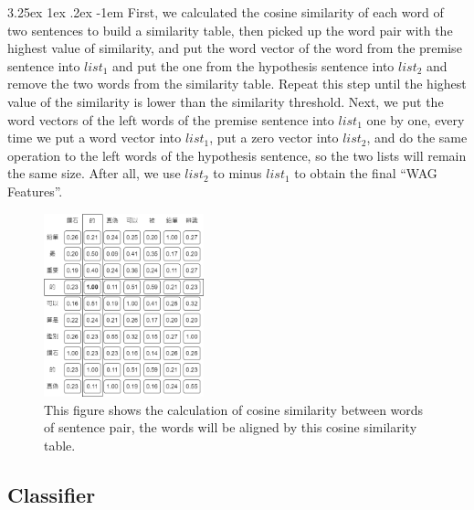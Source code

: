\documentclass[12pt]{article}
\makeatletter
\renewcommand\paragraph{\@startsection{paragraph}{5}{\z@}%
  {3.25ex \@plus1ex \@minus.2ex}%
  {-1em}%
  {\normalfont\normalsize\bfseries}}
\makeatother
\begin{document}
\begin{CJK*}{UTF8}{bkai}
\begin{spacing}{1.77}
\paragraph{}
First, we calculated the cosine similarity of each word of two sentences to build a similarity table, then picked up the word pair with the highest value of similarity, and put the word vector of the word from the premise sentence into $list_1$ and put the one from the hypothesis sentence into $list_2$ and remove the two words from the similarity table. Repeat this step until the highest value of the similarity is lower than the similarity threshold. Next, we put the word vectors of the left words of the premise sentence into $list_1$ one by one, every time we put a word vector into $list_1$, put a zero vector into $list_2$, and do the same operation to the left words of the hypothesis sentence, so the two lists will remain the same size. After all, we use $list_2$ to minus $list_1$ to obtain the final ``WAG Features''.

\begin{figure}[!ht]
  \centering
  \includegraphics[width=175px]{CSA.png}
  \caption[Word-Alignment Groups]{This figure shows the calculation of cosine similarity between words of sentence pair, the words will be aligned by this cosine similarity table.}
  \label{fig:csa}
\end{figure}

\subsection{Classifier}


\end{spacing}
\end{CJK*}
\end{document}
